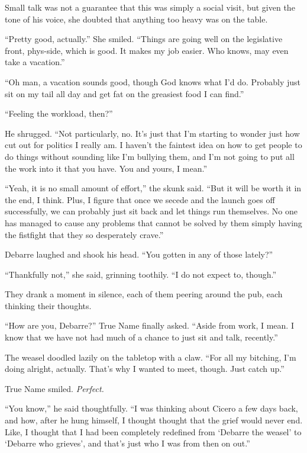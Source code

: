 Small talk was not a guarantee that this was simply a social visit, but given the tone of his voice, she doubted that anything too heavy was on the table.

``Pretty good, actually.'' She smiled. ``Things are going well on the legislative front, phys-side, which is good. It makes my job easier. Who knows, may even take a vacation.''

``Oh man, a vacation sounds good, though God knows what I'd do. Probably just sit on my tail all day and get fat on the greasiest food I can find.''

``Feeling the workload, then?''

He shrugged. ``Not particularly, no. It's just that I'm starting to wonder just how cut out for politics I really am. I haven't the faintest idea on how to get people to do things without sounding like I'm bullying them, and I'm not going to put all the work into it that you have. You and yours, I mean.''

``Yeah, it is no small amount of effort,'' the skunk said. ``But it will be worth it in the end, I think. Plus, I figure that once we secede and the launch goes off successfully, we can probably just sit back and let things run themselves. No one has managed to cause any problems that cannot be solved by them simply having the fistfight that they so desperately crave.''

Debarre laughed and shook his head. ``You gotten in any of those lately?''

``Thankfully not,'' she said, grinning toothily. ``I do not expect to, though.''

They drank a moment in silence, each of them peering around the pub, each thinking their thoughts.

``How are you, Debarre?'' True Name finally asked. ``Aside from work, I mean. I know that we have not had much of a chance to just sit and talk, recently.''

The weasel doodled lazily on the tabletop with a claw. ``For all my bitching, I'm doing alright, actually. That's why I wanted to meet, though. Just catch up.''

True Name smiled. \emph{Perfect.}

``You know,'' he said thoughtfully. ``I was thinking about Cicero a few days back, and how, after he hung himself, I thought thought that the grief would never end. Like, I thought that I had been completely redefined from `Debarre the weasel' to `Debarre who grieves', and that's just who I was from then on out.''


